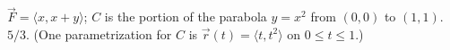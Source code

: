 {$\vec F = \langle x,x+y\rangle$; $C$ is the portion of the parabola $y=x^2$ from $(0,0)$ to $(1,1)$.
}
{$5/3$. (One parametrization for $C$ is $\vec r(t) = \langle t,t^2\rangle$ on $0\leq t\leq 1$.)
}
